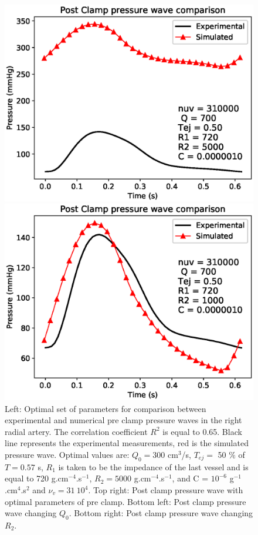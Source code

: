 \documentclass{config}
\begin{document}
\begin{figure}[H]
\begin{minipage}{0.48 \textwidth}
\centering
\includegraphics[scale=0.52]{Figures/postclamp_QR.eps}
\end{minipage}
\begin{minipage}{0.48 \textwidth}
\includegraphics[scale=0.52]{Figures/postclamp_Q.eps}
\end{minipage}

\caption{Left: Optimal set of parameters for comparison between experimental and numerical pre clamp pressure waves in the right radial artery. The correlation coefficient $R^2 $ is equal to 0.65. Black line represents the experimental measurements, red is the simulated pressure wave. Optimal values are: $Q_0 = 300 $ cm$^3$/s, $T_{ej}= $ 50 $\%$ of $T = 0.57 $ s, $R_1$ is taken to be the impedance of the last vessel and is equal to 720 g.cm$^{-4}$.s$^{-1}$, $R_2 = 5000 $ g.cm$^{-4}$.s$^{-1}$, and C = $10^{-6}$ g$^{-1}$.cm$^{4}$.s$^{2}$ and $\nu_v = 31 ~ 10^4$. Top right: Post clamp pressure wave with optimal parameters of pre clamp. Bottom left: Post clamp pressure wave changing $Q_0$. Bottom right: Post clamp pressure wave changing $R_2$. }
\label{best_pre_clamp}
\end{figure}
\end{document}
